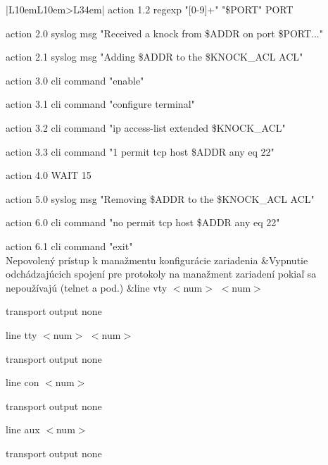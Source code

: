 \begin{longtable}[!htbp]{|L{10em}L{10em}>{\selectfont}L{34em}|}
	\hspace{0.5em}action 1.2 regexp "[0-9]+" "\$PORT" PORT 
	
	\hspace{0.5em}action 2.0 syslog msg "Received a knock from \$ADDR on port \$PORT..."
	
	\hspace{0.5em}action 2.1 syslog msg "Adding \$ADDR to the \$KNOCK\_ACL ACL"
	
	\hspace{0.5em}action 3.0 cli command "enable"
	
	\hspace{0.5em}action 3.1 cli command "configure terminal"
	
	\hspace{0.5em}action 3.2 cli command "ip access-list extended \$KNOCK\_ACL"
	
	\hspace{0.5em}action 3.3 cli command "1 permit tcp host \$ADDR any eq 22"
	
	\hspace{0.5em}action 4.0 WAIT 15
	
	\hspace{0.5em}action 5.0 syslog msg "Removing \$ADDR to the \$KNOCK\_ACL ACL"
	
	\hspace{0.5em}action 6.0 cli command "no permit tcp host \$ADDR any eq 22"
	
	\hspace{0.5em}action 6.1 cli command "exit"\\
	
	
	
	Nepovolený prístup k manažmentu konfigurácie zariadenia	&Vypnutie odchádzajúcich spojení pre protokoly na manažment zariadení pokiaľ sa nepoužívajú (telnet a pod.)	&line vty $<$num$>$ $<$num$>$
	
	\hspace{0.5em}transport output none
	
	line tty $<$num$>$ $<$num$>$
	
	\hspace{0.5em}transport output none
	
	line con $<$num$>$
	
	\hspace{0.5em}transport output none
	
	line aux $<$num$>$
	
	\hspace{0.5em}transport output none\\
	

\end{longtable}

